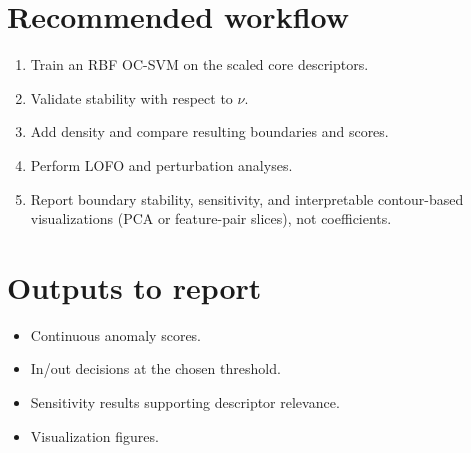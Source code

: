 \documentclass[11pt]{article}
\begin{document}
\section{Recommended workflow}

\begin{enumerate}
\item Train an RBF OC-SVM on the scaled core descriptors.
\item Validate stability with respect to $\nu$.
\item Add density and compare resulting boundaries and scores.
\item Perform LOFO and perturbation analyses.
\item Report boundary stability, sensitivity, and interpretable contour-based visualizations (PCA or feature-pair slices), not coefficients.
\end{enumerate}

\section{Outputs to report}

\begin{itemize}
\item Continuous anomaly scores.
\item In/out decisions at the chosen threshold.
\item Sensitivity results supporting descriptor relevance.
\item Visualization figures.
\end{itemize}
\end{document}
